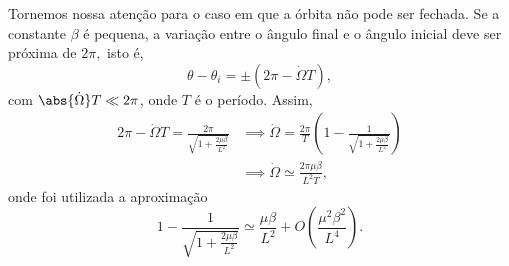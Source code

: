 Tornemos nossa atenção para o caso em que a órbita não pode ser fechada. Se a constante \(\beta\) é pequena, a variação entre o ângulo final e o ângulo inicial deve ser próxima de \(2\pi,\) isto é,
\begin{equation}
    \theta - \theta_i = \pm(2\pi - \dot\Omega T),
\end{equation}
com \(\abs{\dot\Omega} T \ll 2\pi\), onde \(T\) é o período. Assim,
\begin{align}
    2\pi - \dot\Omega T = \frac{2\pi}{\sqrt{1 + \frac{2\mu\beta}{L^2}}} &\implies \dot\Omega = \frac{2\pi}{T}\left(1 - \frac{1}{\sqrt{1 + \frac{2\mu\beta}{L^2}}}\right)\\
                                                                        &\implies \dot\Omega \simeq \frac{2\pi\mu\beta}{L^2T},
\end{align}
onde foi utilizada a aproximação
\begin{equation}
    1 - \frac{1}{\sqrt{1 + \frac{2\mu\beta}{L^2}}} \simeq \frac{\mu\beta}{L^2} + O\left(\frac{\mu^2\beta^2}{L^4}\right).
\end{equation}


